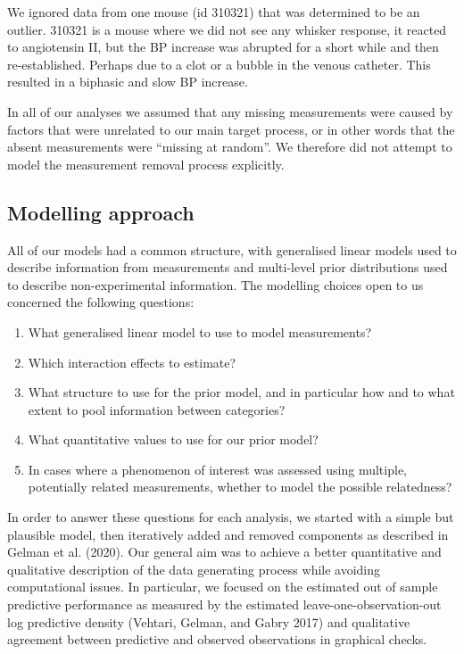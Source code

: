 \documentclass[
  letterpaper,
  DIV=11,
  numbers=noendperiod,
  oneside]{scrartcl}
\theoremstyle{plain}
\theoremstyle{remark}
\begin{document}
We ignored data from one mouse (id 310321) that was determined to be an
outlier. 310321 is a mouse where we did not see any whisker response, it
reacted to angiotensin II, but the BP increase was abrupted for a short
while and then re-established. Perhaps due to a clot or a bubble in the
venous catheter. This resulted in a biphasic and slow BP increase.

In all of our analyses we assumed that any missing measurements were
caused by factors that were unrelated to our main target process, or in
other words that the absent measurements were ``missing at random''. We
therefore did not attempt to model the measurement removal process
explicitly.

\subsection{Modelling approach}\label{modelling-approach}

All of our models had a common structure, with generalised linear models
used to describe information from measurements and multi-level prior
distributions used to describe non-experimental information. The
modelling choices open to us concerned the following questions:

\begin{enumerate}
\def\labelenumi{\arabic{enumi}.}
\item
  What generalised linear model to use to model measurements?
\item
  Which interaction effects to estimate?
\item
  What structure to use for the prior model, and in particular how and
  to what extent to pool information between categories?
\item
  What quantitative values to use for our prior model?
\item
  In cases where a phenomenon of interest was assessed using multiple,
  potentially related measurements, whether to model the possible
  relatedness?
\end{enumerate}

In order to answer these questions for each analysis, we started with a
simple but plausible model, then iteratively added and removed
components as described in Gelman et al. (2020). Our general aim was to
achieve a better quantitative and qualitative description of the data
generating process while avoiding computational issues. In particular,
we focused on the estimated out of sample predictive performance as
measured by the estimated leave-one-observation-out log predictive
density (Vehtari, Gelman, and Gabry 2017) and qualitative agreement
between predictive and observed observations in graphical checks.
\end{document}
